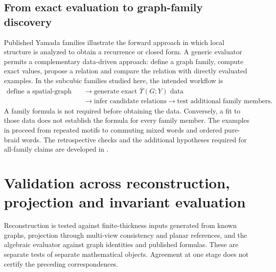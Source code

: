 \documentclass[10pt,twocolumn]{article}
\begin{document}
\subsection{From exact evaluation to graph-family discovery}
\label{supp:yamada_discovery_bridge}
Published Yamada families illustrate the forward approach in which local structure is analyzed to obtain a recurrence or closed form. A generic evaluator permits a complementary data-driven approach: define a graph family, compute exact values, propose a relation and compare the relation with directly evaluated examples. In the subcubic families studied here, the intended workflow is
\begin{equation}
\boxed{\begin{aligned}
\text{define a spatial-graph family}&\longrightarrow\text{generate exact }\overline{\Upsilon}(G;Y)\text{ data}\\
&\longrightarrow\text{infer candidate relations}\longrightarrow\text{test additional family members}.
\end{aligned}}
\label{suppeq:yamada_discovery_bridge}
\end{equation}
A family formula is not required before obtaining the data. Conversely, a fit to those data does not establish the formula for every family member. The examples in  proceed from repeated motifs to commuting mixed words and ordered pure-braid words. The retrospective checks and the additional hypotheses required for all-family claims are developed in .
\FloatBarrier

\section{Validation across reconstruction, projection and invariant evaluation}
\label{supp:validation}
Reconstruction is tested against finite-thickness inputs generated from known graphs, projection through multi-view consistency and planar references, and the algebraic evaluator against graph identities and published formulas. These are separate tests of separate mathematical objects. Agreement at one stage does not certify the preceding correspondences.
\end{document}
